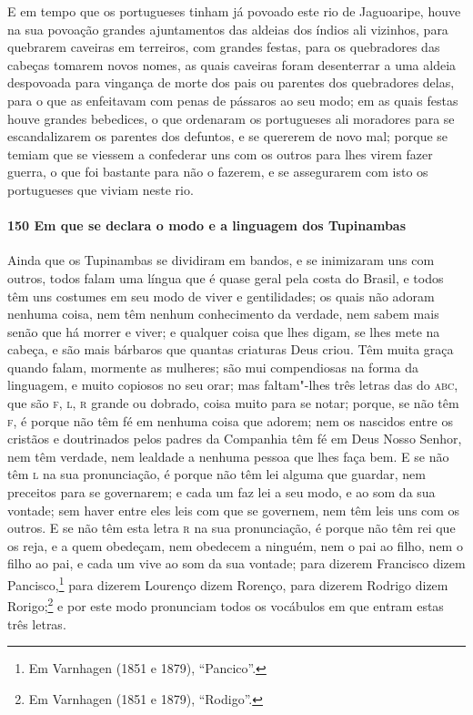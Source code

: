 \begin{linenumbers}
E em tempo que os portugueses tinham já povoado este rio de Jaguoaripe, houve na sua
povoação grandes ajuntamentos das aldeias dos índios ali vizinhos, para quebrarem caveiras
em terreiros, com grandes festas, para os quebradores das cabeças tomarem novos nomes, as
quais caveiras foram desenterrar a uma aldeia despovoada para vingança de morte dos pais
ou parentes dos quebradores delas, para o que as enfeitavam com penas de pássaros ao seu
modo; em as quais festas houve grandes bebedices, o que ordenaram os portugueses ali
moradores para se escandalizarem os parentes dos defuntos, e se quererem de novo mal;
porque se temiam que se viessem a confederar uns com os outros para lhes virem fazer
guerra, o que foi bastante para não o fazerem, e se assegurarem com isto os portugueses
que viviam neste rio.

\paragraph{150 Em que se declara o modo e a linguagem dos Tupinambas}\quad
Ainda que os Tupinambas se dividiram em bandos, e se inimizaram uns com outros, todos
falam uma língua que é quase geral pela costa do Brasil, e todos têm uns costumes em seu
modo de viver e gentilidades; os quais não adoram nenhuma coisa, nem têm nenhum
conhecimento da verdade, nem sabem mais senão que há morrer e viver; e qualquer coisa que
lhes digam, se lhes mete na cabeça, e são mais bárbaros que quantas criaturas Deus criou.
Têm muita graça quando falam, mormente as mulheres; são mui compendiosas na forma da
linguagem, e muito copiosos no seu orar; mas faltam"-lhes três letras das do \textsc{abc},
que são \textsc{f, l, r} grande ou dobrado, coisa muito para se notar; porque, se não têm
\textsc{f}, é porque não têm fé em nenhuma coisa que adorem; nem os nascidos entre os
cristãos e doutrinados pelos padres da Companhia têm fé em Deus Nosso Senhor, nem têm
verdade, nem lealdade a nenhuma pessoa que lhes faça bem. E se não têm \textsc{l} na sua
pronunciação, é porque não têm lei alguma que guardar, nem preceitos para se governarem; e
cada um faz lei a seu modo, e ao som da sua vontade; sem haver entre eles leis com que se
governem, nem têm leis uns com os outros. E se não têm esta letra \textsc{r} na sua
pronunciação, é porque não têm rei que os reja, e a quem obedeçam, nem obedecem a ninguém,
nem o pai ao filho, nem o filho ao pai, e cada um vive ao som da sua vontade; para dizerem
Francisco dizem Pancisco,\footnote{ Em Varnhagen (1851 e 1879), ``Pancico''.} para dizerem
Lourenço dizem Rorenço, para dizerem Rodrigo dizem Rorigo;\footnote{ Em Varnhagen (1851 e
1879), ``Rodigo''.} e por este modo pronunciam todos os vocábulos em que entram estas
três letras.


\end{linenumbers}
